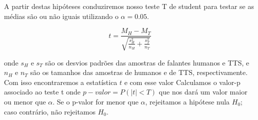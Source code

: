 \documentclass{article}
\begin{document}
A partir destas hipóteses conduziremos nosso teste T de student para testar se as médias são ou não iguais utilizando o $\alpha = 0.05$.


\begin{equation}
t = \frac{M_H - M_T}{\sqrt{\frac{s_H^2}{n_H} + \frac{s_T^2}{n_T}}}
\end{equation}

onde $s_H$ e $s_T$ são os desvios padrões das amostras de falantes humanos e TTS, e $n_H$ e $n_T$ são os tamanhos das amostras de humanos e de TTS, respectivamente. Com isso encontraremos a estatística $t$ e com esse valor Calculamos o valor-p associado ao teste t onde $p-valor = P(|t| < T)$ que nos dará um valor maior ou menor que $\alpha$. Se o p-valor for menor que $\alpha$, rejeitamos a hipótese nula $H_0$; caso contrário, não rejeitamos $H_0$.



\end{document}
